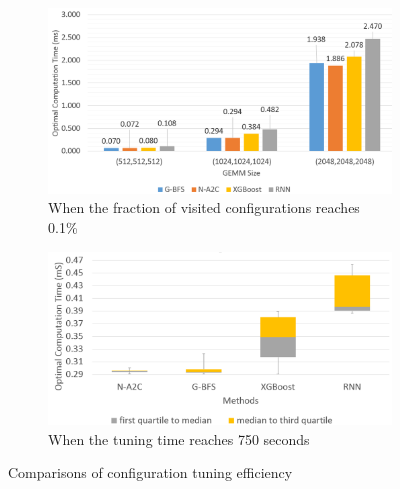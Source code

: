 \begin{figure}[t]
    \centering
    \begin{subfigure}[b]{0.42\textwidth}
    \includegraphics[width=\linewidth]{5_Simu/simu_21.png}
    \caption{When the fraction of visited configurations reaches 0.1\%}
    \label{fig:simu21}
    \end{subfigure}
    \hspace{0.2in}
    \begin{subfigure}[b]{0.42\textwidth}
    \includegraphics[width=\linewidth]{5_Simu/simu_23.png}
    \caption{When the tuning time reaches 750 seconds}
    \label{fig:simu23}
    \end{subfigure}
    \caption{Comparisons of configuration tuning efficiency}
    \label{fig:multi_case}
\end{figure}


